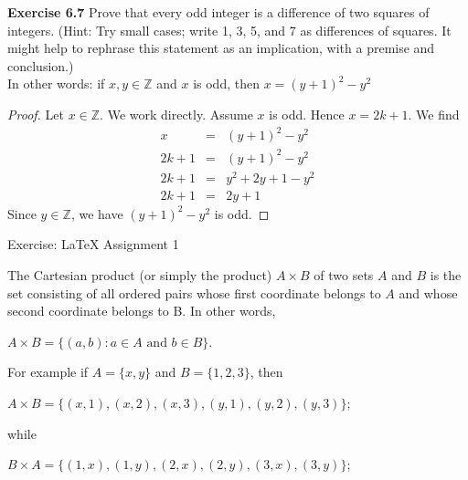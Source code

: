 \documentclass[12pt,oneside]{article}
\newenvironment{exercise}[1]{\vspace{.1in}\noindent\textbf{Exercise #1 \hspace{.05em}}}{}
\newcommand{\Z}{\mathbb{Z}}
\begin{document}

\begin{exercise}{6.7}
Prove that every odd integer is a difference of two squares of integers. (Hint: Try small cases; write 1, 3, 5, and 7 as differences of squares. It might help to rephrase this statement as an implication, with a premise and conclusion.) \\
In other words: if $x,y \in \Z$ and $x$ is odd, then $x = (y + 1)^2 - y^2$
\end{exercise}

\begin{proof}
Let $x \in \Z$. We work directly. Assume $x$ is odd. Hence $x = 2k + 1$. We find
\begin{eqnarray*}
x &=& (y + 1)^2 - y^2 \\
2k + 1 &=& (y + 1)^2 - y^2 \\
2k + 1 &=& y^2 + 2y + 1 - y^2 \\
2k + 1 &=& 2y + 1
\end{eqnarray*}
Since $y \in \Z$, we have $(y + 1)^2 - y^2$ is odd.
\end{proof}


\newpage

\begin{center}
\textsf{Exercise: LaTeX Assignment 1}
\end{center}

The Cartesian product (or simply the product) $A \times B$ of two sets $A$ and $B$ is the set consisting of all ordered pairs whose first coordinate belongs to $A$ and whose second coordinate belongs to B. In other words,

\begin{center}
    $A \times B = \{(a,b) : a \in A \text{ and } b \in B\}$.
\end{center}

\begin{flushleft}
For example if $A=\{x,y\}$ and $B=\{1,2,3\}$, then
\end{flushleft}

\begin{center}
    $A \times B = \{(x,1),(x,2),(x,3),(y,1),(y,2),(y,3)\}$;
\end{center}

\begin{flushleft}
while
\end{flushleft}

\begin{center}
    $B \times A = \{(1,x),(1,y),(2,x),(2,y),(3,x),(3,y)\}$;
\end{center}
\end{document}
